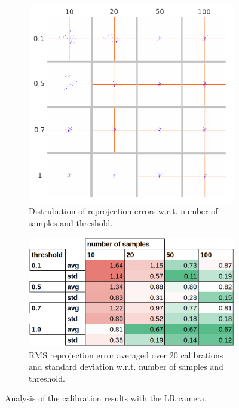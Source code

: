 \begin{figure}[H]
  \centering
  \begin{subfigure}{.5\textwidth}
    \centering
    \includegraphics[width=.8\linewidth]{figures/reprj_dist_LR.png}
    \caption{Distrubution of reprojection errors w.r.t. \newline number of samples and threshold.}
    \label{fig:reprj_dist_LR}
  \end{subfigure}%
  \begin{subfigure}{.5\textwidth}
    \centering
    \includegraphics[width=1\linewidth]{figures/calib_results_table_LR.png}
    \caption{RMS reprojection error averaged over 20 calibrations and standard deviation w.r.t. number of samples and threshold.}
    \label{fig:calib_stats_LR}
  \end{subfigure}
  \caption{Analysis of the calibration results with the LR camera.}
  \label{fig:calib_analysis_LR}
\end{figure}

